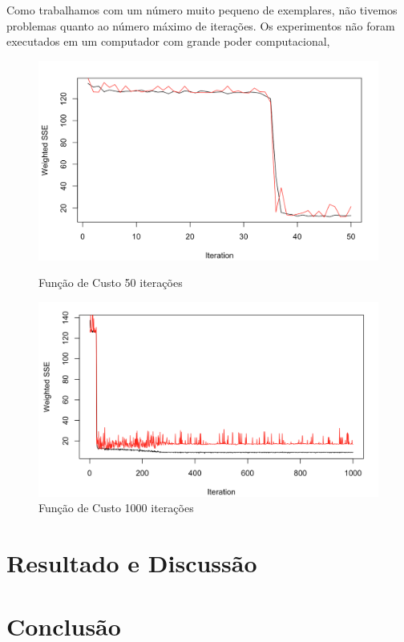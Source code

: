 \documentclass[conference]{IEEEtran}
\begin{document}
    Como trabalhamos com um número muito pequeno de exemplares, não tivemos problemas quanto ao número máximo de iterações. Os experimentos não foram executados em um computador com grande poder computacional, 

    \begin{figure}[htbp]
	\centerline{\includegraphics[scale=0.35]{imagens/9,8,8,5,3-50.png}}
	\caption{Função de Custo 50 iterações}
	
	\centerline{\includegraphics[scale=0.35]{imagens/9,8,8,5,3-1000.png}}
	\caption{Função de Custo 1000 iterações}
	\label{fig}
	\end{figure}
	
\section{Resultado e Discussão}

   
    
\section*{Conclusão}
\end{document}
